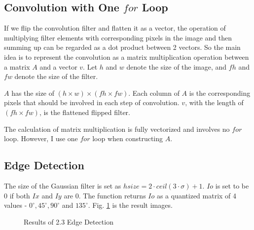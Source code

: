 \documentclass[
  course = {{16-720B Computer Vision}},
  quartile = {{1}},
  assignment = 1-Hough\ Transform,
  name = {{Kangle Deng}},
  email = {{kangled@andrew.cmu.edu}},
  firstexercise = 1
]{aga-homework}
\begin{document}
\subsection{Convolution with One $for$ Loop}
If we flip the convolution filter and flatten it as a vector, the operation of multiplying filter elements with corresponding pixels in the image and then summing up can be regarded as a dot product between 2 vectors. So the main idea is to represent the convolution as a matrix multiplication operation between a matrix $A$ and a vector $v$. Let $h$ and $w$ denote the size of the image, and $fh$ and $fw$ denote the size of the filter.

$A$ has the size of $(h\times w) \times (fh \times fw)$. Each column of $A$ is the corresponding pixels that should be involved in each step of convolution. $v$, with the length of $(fh \times fw)$, is the flattened flipped filter. 

The calculation of matrix multiplication is fully vectorized and involves no $for$ loop. However, I use one $for$ loop when constructing $A$.

\subsection{Edge Detection}
The size of the Gaussian filter is set as $hsize = 2 \cdot ceil(3\cdot \sigma) + 1$. $Io$ is set to be $0$ if both $Ix$ and $Iy$ are $0$. The function returns $Io$ as a quantized matrix of 4 values - $0^{\circ}, 45^{\circ}, 90^{\circ}$ and $135^{\circ}$. Fig. \ref{fig:edge} is the result images.


\begin{figure}
    \centering

    \caption{Results of 2.3 Edge Detection}
    \label{fig:edge}
\end{figure}
\end{document}
